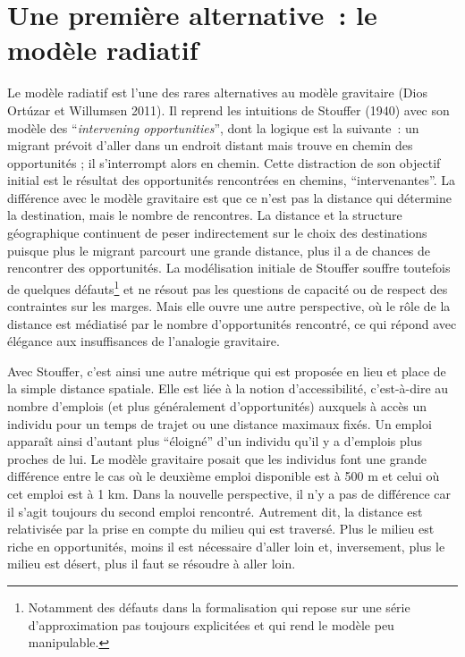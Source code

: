 \documentclass[
  10pt,
  a4paper,
  numbers=noendperiod,
  DIV=9]{scrartcl}
\begin{document}
\hypertarget{sec-rad}{%
\section{Une première alternative~: le modèle radiatif}\label{sec-rad}}

Le modèle radiatif est l'une des rares alternatives au modèle gravitaire
(Dios Ortúzar et Willumsen 2011). Il reprend les intuitions de Stouffer
(1940) avec son modèle des ``\emph{intervening opportunities}'', dont la
logique est la suivante~: un migrant prévoit d'aller dans un endroit
distant mais trouve en chemin des opportunités ; il s'interrompt alors
en chemin. Cette distraction de son objectif initial est le résultat des
opportunités rencontrées en chemins, ``intervenantes''. La différence
avec le modèle gravitaire est que ce n'est pas la distance qui détermine
la destination, mais le nombre de rencontres. La distance et la
structure géographique continuent de peser indirectement sur le choix
des destinations puisque plus le migrant parcourt une grande distance,
plus il a de chances de rencontrer des opportunités. La modélisation
initiale de Stouffer souffre toutefois de quelques défauts\footnote{Notamment
  des défauts dans la formalisation qui repose sur une série
  d'approximation pas toujours explicitées et qui rend le modèle peu
  manipulable.} et ne résout pas les questions de capacité ou de respect
des contraintes sur les marges. Mais elle ouvre une autre perspective,
où le rôle de la distance est médiatisé par le nombre d'opportunités
rencontré, ce qui répond avec élégance aux insuffisances de l'analogie
gravitaire.

Avec Stouffer, c'est ainsi une autre métrique qui est proposée en lieu
et place de la simple distance spatiale. Elle est liée à la notion
d'accessibilité, c'est-à-dire au nombre d'emplois (et plus généralement
d'opportunités) auxquels à accès un individu pour un temps de trajet ou
une distance maximaux fixés. Un emploi apparaît ainsi d'autant plus
``éloigné'' d'un individu qu'il y a d'emplois plus proches de lui. Le
modèle gravitaire posait que les individus font une grande différence
entre le cas où le deuxième emploi disponible est à 500 m et celui où
cet emploi est à 1 km. Dans la nouvelle perspective, il n'y a pas de
différence car il s'agit toujours du second emploi rencontré. Autrement
dit, la distance est relativisée par la prise en compte du milieu qui
est traversé. Plus le milieu est riche en opportunités, moins il est
nécessaire d'aller loin et, inversement, plus le milieu est désert, plus
il faut se résoudre à aller loin.
\end{document}
